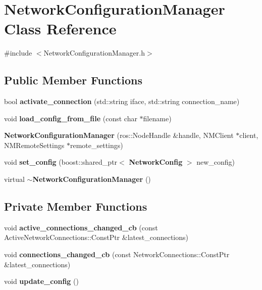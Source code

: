 \section{\-Network\-Configuration\-Manager \-Class \-Reference}
\label{classNetworkConfigurationManager}


{\ttfamily \#include $<$\-Network\-Configuration\-Manager.\-h$>$}

\subsection*{\-Public \-Member \-Functions}
\begin{DoxyCompactItemize}
\item 
bool {\bf activate\-\_\-connection} (std\-::string iface, std\-::string connection\-\_\-name)
\item 
void {\bf load\-\_\-config\-\_\-from\-\_\-file} (const char $\ast$filename)
\item 
{\bf \-Network\-Configuration\-Manager} (ros\-::\-Node\-Handle \&handle, \-N\-M\-Client $\ast$client, \-N\-M\-Remote\-Settings $\ast$remote\-\_\-settings)
\item 
void {\bf set\-\_\-config} (boost\-::shared\-\_\-ptr$<$ {\bf \-Network\-Config} $>$ new\-\_\-config)
\item 
virtual {\bf $\sim$\-Network\-Configuration\-Manager} ()
\end{DoxyCompactItemize}
\subsection*{\-Private \-Member \-Functions}
\begin{DoxyCompactItemize}
\item 
void {\bf active\-\_\-connections\-\_\-changed\-\_\-cb} (const \-Active\-Network\-Connections\-::\-Const\-Ptr \&latest\-\_\-connections)
\item 
void {\bf connections\-\_\-changed\-\_\-cb} (const \-Network\-Connections\-::\-Const\-Ptr \&latest\-\_\-connections)
\item 
void {\bf update\-\_\-config} ()
\end{DoxyCompactItemize}

